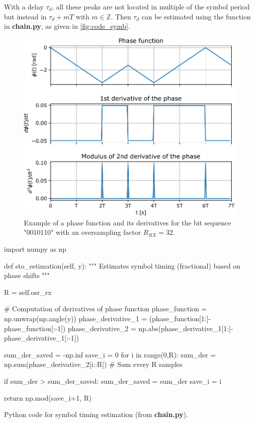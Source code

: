 With a delay $\tau_d$, all these peaks are not located in multiple of the symbol period but instead in $\tau_d+m T$ with $m\in \mathbb{Z}$. Then $\tau_d$ can be estimated using the function  in \textbf{chain.py}, as given in \autoref{fig:code_symb}.

\begin{figure}[H]
    \centering
    \includegraphics[scale=0.75]{figures/phase_function_bis.pdf}
    \caption{Example of a phase function and its derivatives for the bit sequence "0010110" with an oversampling factor $R_{RX}=32$.}
    \label{fig:phase_funct}
\end{figure}




\begin{listing}[H]
\begin{python}
import numpy as np

def sto_estimation(self, y):
    """
    Estimates symbol timing (fractional) based on phase shifts
    """

    R = self.osr_rx

    # Computation of derivatives of phase function
    phase_function = np.unwrap(np.angle(y))
    phase_derivative_1 = (phase_function[1:]-phase_function[:-1])
    phase_derivative_2 = np.abs(phase_derivative_1[1:]-phase_derivative_1[:-1])

    sum_der_saved = -np.inf
    save_i = 0
    for i in range(0,R):
        sum_der = np.sum(phase_derivative_2[i::R]) # Sum every R samples

        if sum_der > sum_der_saved:
            sum_der_saved = sum_der
            save_i = i

    return np.mod(save_i+1, R)

\end{python}
\caption{Python code for symbol timing estimation (from \textbf{chain.py}).}
\label{fig:code_symb}
\end{listing}


